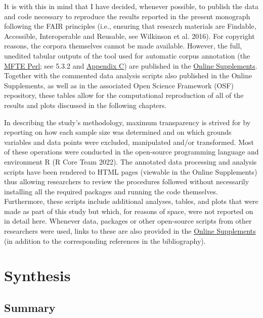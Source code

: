 \documentclass[
  letterpaper,
  DIV=11,
  numbers=noendperiod]{scrreprt}
\begin{document}
It is with this in mind that I have decided, whenever possible, to
publish the data and code necessary to reproduce the results reported in
the present monograph following the FAIR principles (i.e., ensuring that
research materials are Findable, Accessible, Interoperable and Reusable,
see Wilkinson et al. 2016). For copyright reasons, the corpora
themselves cannot be made available. However, the full, unedited tabular
outputs of the tool used for automatic corpus annotation (the
\href{https://github.com/elenlefoll/MultiFeatureTaggerEnglish}{MFTE
Perl}; see 5.3.2 and
\href{https://elenlefoll.github.io/TextbookMDA/AppendixC.html}{Appendix
C}) are published in the
\href{https://elenlefoll.github.io/TextbookMDA}{Online Supplements}.
Together with the commented data analysis scripts also published in the
Online Supplements, as well as in the associated Open Science Framework
(OSF) repository, these tables allow for the computational reproduction
of all of the results and plots discussed in the following chapters.

In describing the study's methodology, maximum transparency is strived
for by reporting on how each sample size was determined and on which
grounds variables and data points were excluded, manipulated and/or
transformed. Most of these operations were conducted in the open-source
programming language and environment R (R Core Team 2022). The annotated
data processing and analysis scripts have been rendered to HTML pages
(viewable in the Online Supplements) thus allowing researchers to review
the procedures followed without necessarily installing all the required
packages and running the code themselves. Furthermore, these scripts
include additional analyses, tables, and plots that were made as part of
this study but which, for reasons of space, were not reported on in
detail here. Whenever data, packages or other open-source scripts from
other researchers were used, links to these are also provided in the
\href{https://elenlefoll.github.io/TextbookMDA/references.html}{Online
Supplements} (in addition to the corresponding references in the
bibliography).


\chapter{Synthesis}\label{synthesis}

\section{Summary}\label{summary}
\end{document}
